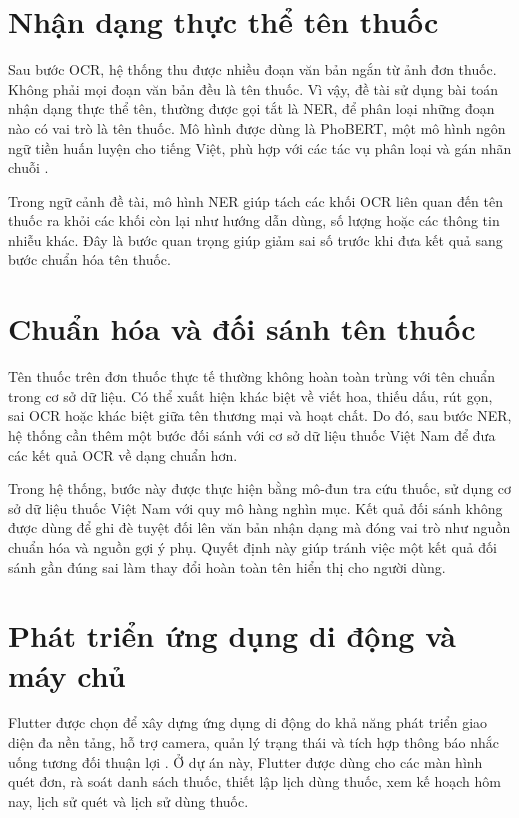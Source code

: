 \documentclass[12pt,a4paper]{report}
\begin{document}
\section{Nhận dạng thực thể tên thuốc}

Sau bước OCR, hệ thống thu được nhiều đoạn văn bản ngắn từ ảnh đơn thuốc. Không phải mọi đoạn văn bản đều là tên thuốc. Vì vậy, đề tài sử dụng bài toán nhận dạng thực thể tên, thường được gọi tắt là NER, để phân loại những đoạn nào có vai trò là tên thuốc. Mô hình được dùng là PhoBERT, một mô hình ngôn ngữ tiền huấn luyện cho tiếng Việt, phù hợp với các tác vụ phân loại và gán nhãn chuỗi \cite{phobert}.

Trong ngữ cảnh đề tài, mô hình NER giúp tách các khối OCR liên quan đến tên thuốc ra khỏi các khối còn lại như hướng dẫn dùng, số lượng hoặc các thông tin nhiễu khác. Đây là bước quan trọng giúp giảm sai số trước khi đưa kết quả sang bước chuẩn hóa tên thuốc.

\section{Chuẩn hóa và đối sánh tên thuốc}

Tên thuốc trên đơn thuốc thực tế thường không hoàn toàn trùng với tên chuẩn trong cơ sở dữ liệu. Có thể xuất hiện khác biệt về viết hoa, thiếu dấu, rút gọn, sai OCR hoặc khác biệt giữa tên thương mại và hoạt chất. Do đó, sau bước NER, hệ thống cần thêm một bước đối sánh với cơ sở dữ liệu thuốc Việt Nam để đưa các kết quả OCR về dạng chuẩn hơn.

Trong hệ thống, bước này được thực hiện bằng mô-đun tra cứu thuốc, sử dụng cơ sở dữ liệu thuốc Việt Nam với quy mô hàng nghìn mục. Kết quả đối sánh không được dùng để ghi đè tuyệt đối lên văn bản nhận dạng mà đóng vai trò như nguồn chuẩn hóa và nguồn gợi ý phụ. Quyết định này giúp tránh việc một kết quả đối sánh gần đúng sai làm thay đổi hoàn toàn tên hiển thị cho người dùng.

\section{Phát triển ứng dụng di động và máy chủ}

Flutter được chọn để xây dựng ứng dụng di động do khả năng phát triển giao diện đa nền tảng, hỗ trợ camera, quản lý trạng thái và tích hợp thông báo nhắc uống tương đối thuận lợi \cite{flutter}. Ở dự án này, Flutter được dùng cho các màn hình quét đơn, rà soát danh sách thuốc, thiết lập lịch dùng thuốc, xem kế hoạch hôm nay, lịch sử quét và lịch sử dùng thuốc.
\end{document}
